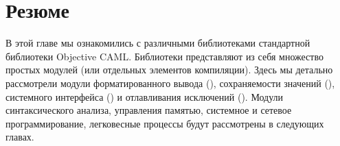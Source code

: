 \section{Резюме}
\label{sec:summary_8}

В этой главе мы ознакомились с различными библиотеками стандартной библиотеки 
Objective CAML. Библиотеки представляют из себя множество простых модулей (или 
отдельных элементов компиляции). Здесь мы детально рассмотрели модули 
форматированного вывода (), сохраняемости значений 
(), системного интерфейса () и отлавливания исключений 
(). Модули синтаксического анализа, управления памятью, 
системное и сетевое программирование, легковесные процессы будут рассмотрены в 
следующих главах.

